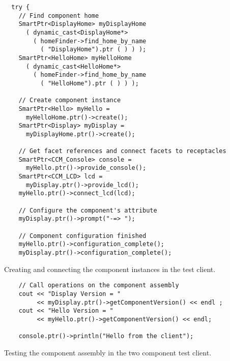 \begin{Example}
\begin{minifbox}
\begin{small}
\begin{verbatim}
  try {
    // Find component home
    SmartPtr<DisplayHome> myDisplayHome
      ( dynamic_cast<DisplayHome*>
        ( homeFinder->find_home_by_name
          ( "DisplayHome").ptr ( ) ) );
    SmartPtr<HelloHome> myHelloHome
      ( dynamic_cast<HelloHome*>
        ( homeFinder->find_home_by_name
          ( "HelloHome").ptr ( ) ) );

    // Create component instance
    SmartPtr<Hello> myHello =
      myHelloHome.ptr()->create();
    SmartPtr<Display> myDisplay =
      myDisplayHome.ptr()->create();

    // Get facet references and connect facets to receptacles
    SmartPtr<CCM_Console> console =
      myHello.ptr()->provide_console();
    SmartPtr<CCM_LCD> lcd =
      myDisplay.ptr()->provide_lcd();
    myHello.ptr()->connect_lcd(lcd);

    // Configure the component's attribute
    myDisplay.ptr()->prompt("-=> ");

    // Component configuration finished
    myHello.ptr()->configuration_complete();
    myDisplay.ptr()->configuration_complete();
\end{verbatim}
\end{small}
\end{minifbox}
\caption{Creating and connecting the component instances in the test client.}
\label{example:two-components-instances}
\end{Example}

\begin{Example}
\begin{minifbox}
\begin{small}
\begin{verbatim}
    // Call operations on the component assembly
    cout << "Display Version = "
         << myDisplay.ptr()->getComponentVersion() << endl ;
    cout << "Hello Version = "
         << myHello.ptr()->getComponentVersion() << endl;

    console.ptr()->println("Hello from the client");
\end{verbatim}
\end{small}
\end{minifbox}
\caption{Testing the component assembly in the two component test client.}
\label{example:two-components-testing}
\end{Example}

